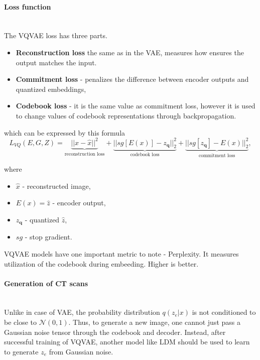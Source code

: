 
\paragraph{Loss function}\mbox{}\\
The VQVAE loss has three parts.

\begin{itemize}
    \item \textbf{Reconstruction loss} the same as in the VAE, measures how ensures the output matches the input.
    \item \textbf{Commitment loss} - penalizes the difference between encoder outputs and quantized embeddings,
    \item \textbf{Codebook loss} - it is the same value as commitment loss, however it is used to change values of codebook representations through backpropagation.
\end{itemize}

which can be expressed by this formula
\begin{equation}
    L_{VQ}(E, G, Z) = \underbrace{||x-\hat{x}||^{2}}_{\text{reconstruction loss}} + \underbrace{||sg[E(x)] - z_\mathbf{q}||_2^2}_{\text{codebook loss}}
+ \underbrace{||sg[z_\mathbf{q}] - E(x) ||_{2}^2}_{\text{commitment loss}},
    \label{loss_vq}
\end{equation}

where
\begin{itemize}
    \item $\hat{x}$ - reconstructed image,
    \item $E(x)=\hat{z}$ - encoder output,
    \item $z_\mathbf{q}$ - quantized $\hat{z}$,
    \item $sg$ - stop gradient.
\end{itemize}

VQVAE models have one important metric to note - Perplexity. It measures utilization of the codebook during embeeding. Higher is better.

\paragraph{Generation of CT scans}\mbox{}\\
\indent Unlike in case of VAE, the probability distribution $q(z_e|x)$ is not conditioned to be close to $\mathcal{N}(0,1)$. Thus, to generate a new image, one cannot just pass a Gaussian noise tensor through the codebook and decoder.
Instead, after successful training of VQVAE, another model like LDM should be used to learn to generate $z_e$ from Gaussian noise.

